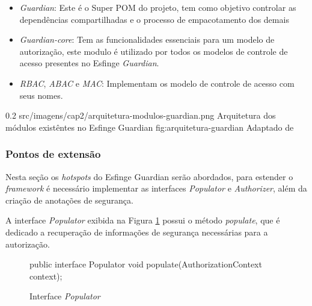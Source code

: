 \begin{itemize}
    \item \textit{Guardian}: Este é o Super POM  do projeto, tem como objetivo controlar as dependências compartilhadas e o processo de empacotamento dos demais
    
    \item \textit{Guardian-core}: Tem as funcionalidades essenciais para um modelo de autorização, este modulo é utilizado por todos os modelos de controle de acesso presentes no Esfinge \textit{Guardian}.
    
    \item \textit{RBAC}, \textit{ABAC} e \textit{MAC}: Implementam os modelo de controle de acesso com seus nomes.
 
\end{itemize}

\begin{image}
{0.2} %
{src/imagens/cap2/arquitetura-modulos-guardian.png} %
{Arquitetura dos módulos existêntes no Esfinge Guardian} %
{fig:arquitetura-guardian} %
{Adaptado de } %
\end{image}

\subsubsection{Pontos de extensão}

\par Nesta seção os \textit{hotspots} do Esfinge Guardian serão abordados, para estender o \textit{framework} é necessário implementar as interfaces \textit{Populator} e \textit{Authorizer}, além da criação de anotações de segurança.

\par A interface \textit{Populator} exibida na Figura \ref{fig:interface-populator} possui o método \textit{populate}, que é dedicado a recuperação de informações de segurança necessárias para a autorização. 

\begin{figure}[H]
    \centering
    \caption{Interface \textit{Populator}}
    \begin{java}
public interface Populator {
	void populate(AuthorizationContext context);
}
    \end{java}
    \label{fig:interface-populator}
\end{figure}

